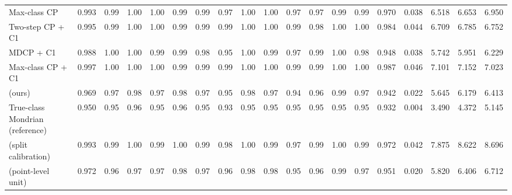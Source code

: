 \begin{table}[!htbp]
{\begin{tabular}{lcccccccccccccccccc}
Max-class CP & 0.993 & 0.99 & 1.00 & 1.00 & 0.99 & 0.99 & 0.97 & 1.00 & 1.00 & 0.97 & 0.97 & 0.99 & 0.99 & 0.970 & 0.038 & 6.518 & 6.653 & 6.950 \\
Two-step CP + C1 & 0.995 & 0.99 & 1.00 & 1.00 & 0.99 & 0.99 & 0.99 & 1.00 & 1.00 & 0.99 & 0.98 & 1.00 & 1.00 & 0.984 & 0.044 & 6.709 & 6.785 & 6.752 \\
MDCP + C1 & 0.988 & 1.00 & 1.00 & 0.99 & 0.99 & 0.98 & 0.95 & 1.00 & 0.99 & 0.97 & 0.99 & 1.00 & 0.98 & 0.948 & 0.038 & 5.742 & 5.951 & 6.229 \\
Max-class CP + C1 & 0.997 & 1.00 & 1.00 & 1.00 & 0.99 & 0.99 & 0.99 & 1.00 & 1.00 & 0.99 & 0.99 & 1.00 & 1.00 & 0.987 & 0.046 & 7.101 & 7.152 & 7.023 \\
\gamut{} (ours) & 0.969 & 0.97 & 0.98 & 0.97 & 0.98 & 0.97 & 0.95 & 0.98 & 0.97 & 0.94 & 0.96 & 0.99 & 0.97 & 0.942 & 0.022 & 5.645 & 6.179 & 6.413 \\
True-class Mondrian (reference) & 0.950 & 0.95 & 0.96 & 0.95 & 0.96 & 0.95 & 0.93 & 0.95 & 0.95 & 0.95 & 0.95 & 0.95 & 0.95 & 0.932 & 0.004 & 3.490 & 4.372 & 5.145 \\
\gamut{} (split calibration) & 0.993 & 0.99 & 1.00 & 0.99 & 1.00 & 0.99 & 0.98 & 1.00 & 0.99 & 0.97 & 0.99 & 1.00 & 0.99 & 0.972 & 0.042 & 7.875 & 8.622 & 8.696 \\
\gamut{} (point-level unit) & 0.972 & 0.96 & 0.97 & 0.97 & 0.98 & 0.97 & 0.96 & 0.98 & 0.98 & 0.95 & 0.96 & 0.99 & 0.97 & 0.951 & 0.020 & 5.820 & 6.406 & 6.712 \\
\bottomrule
\end{tabular}}
\end{table}
\FloatBarrier

